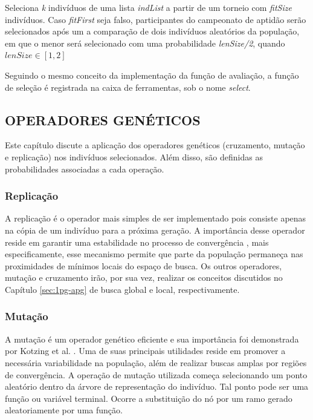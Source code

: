 {Seleciona \textit{k} indivíduos de uma lista \textit{indList} a partir de um torneio
	com \textit{fitSize} indivíduos. Caso \textit{fitFirst} seja falso, participantes do campeonato de aptidão serão selecionados após um a comparação de dois indivíduos aleatórios da população, em que o menor será selecionado com uma probabilidade \textit{lenSize/2}, quando $lenSize\in [1,2]$}

Seguindo o mesmo conceito da implementação da função de avaliação, a função de seleção é registrada na caixa de ferramentas, sob o nome \textit{select}.

\subsection{OPERADORES GENÉTICOS}\label{ssec:3deap-opgeneticos}

Este capítulo discute a aplicação dos operadores genéticos (cruzamento, mutação e
replicação) nos indivíduos selecionados. Além disso, são definidas as probabilidades associadas a
cada operação.

\subsubsection{Replicação}\label{sssec:3deap-replicacao}

A replicação é o operador mais simples de ser implementado
pois consiste apenas na cópia de um indivíduo para a próxima geração. A importância desse operador
reside em garantir uma estabilidade no processo de convergência \cite{duriez17bookMlc}, mais
especificamente, esse mecanismo permite que parte da população permaneça nas proximidades de mínimos
locais do espaço de busca. Os outros operadores, mutação e cruzamento irão, por sua vez, realizar os
conceitos discutidos no Capítulo \ref{sec:1pg-apg} de busca global e local, respectivamente.

\subsubsection{Mutação}\label{sssec:3deap-mutacao}

A mutação é um operador genético eficiente e sua importância foi demonstrada por Kotzing et al. \cite{kotzing14mut}. Uma de suas principais utilidades reside em promover a necessária variabilidade na população, além de realizar buscas amplas por regiões de convergência. A operação de mutação utilizada começa selecionando um ponto aleatório dentro da
árvore de representação do indivíduo. Tal ponto pode ser uma função ou
variável terminal. Ocorre a substituição do nó por um ramo gerado aleatoriamente por uma função.

